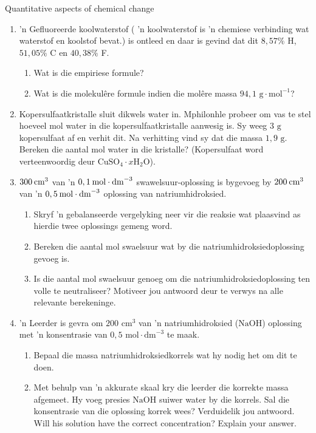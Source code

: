 \begin{eocexercises}{Quantitative aspects of chemical change}
\begin{enumerate}[noitemsep, label=\textbf{\arabic*}. ]
\item  'n Gefluoreerde koolwaterstof ( 'n koolwaterstof is 'n chemiese verbinding wat waterstof en koolstof bevat.) is ontleed en daar is gevind dat dit $8,57\%$ H, $51,05\%$ C en $40,38\%$ F.
 \begin{enumerate}[noitemsep, label=\textbf{\alph*}. ] 
 \item Wat is die empiriese formule?
 \item Wat is die molekulêre formule indien die mol\^{e}re massa $94,1\text{ g}\cdot {\text{mol}}^{-1}$?
 \end{enumerate}
\item Kopersulfaatkristalle sluit dikwels water in. Mphilonhle probeer om vas te stel hoeveel mol water in die kopersulfaatkristalle aanwesig is. Sy weeg $3 \text{ g}$ kopersulfaat af en verhit dit. Na verhitting vind sy dat die massa $1,9 \text{ g}$. Bereken die aantal mol water in die kristalle? (Kopersulfaat word verteenwoordig deur ${\text{CuSO}}_{4}\cdot x{\text{H}}_{2}\text{O}$).        
\item $300\phantom{\rule{2pt}{0ex}}{\text{cm}}^{3}$ van 'n $0,1\phantom{\rule{2pt}{0ex}}\text{mol}\ensuremath{\cdot}{\text{dm}}^{-3}$ swawelsuur-oplossing is bygevoeg by $200\phantom{\rule{2pt}{0ex}}{\text{cm}}^{3}$ van 'n $0,5\phantom{\rule{2pt}{0ex}}\text{mol}\ensuremath{\cdot}{\text{dm}}^{-3}$ oplossing van natriumhidroksied.
 \begin{enumerate}[noitemsep, label=\textbf{\alph*}. ] 
 \item Skryf 'n gebalanseerde vergelyking neer vir die reaksie wat plaasvind as hierdie twee oplossings gemeng word.
 \item Bereken die aantal mol swaelsuur wat by die natriumhidroksiedoplossing gevoeg is.
 \item Is die aantal mol swaelsuur genoeg om die natriumhidroksiedoplossing ten volle te neutraliseer? Motiveer jou antwoord deur te verwys na alle relevante berekeninge.
 \end{enumerate}
\item 'n Leerder is gevra om $200 {\text{ cm}}^{3}$ van  'n natriumhidroksied ($\text{NaOH}$) oplossing met  'n konsentrasie van $0,5 \text{ mol} \cdot {\text{dm}}^{-3}$ te maak.
 \begin{enumerate}[noitemsep, label=\textbf{\alph*}. ] 
 \item Bepaal die massa natriumhidroksiedkorrels wat hy nodig het om dit te doen.
 \item Met behulp van 'n akkurate skaal kry die leerder die korrekte massa afgemeet. Hy voeg presies $\text{NaOH}$ suiwer water by die korrels. Sal die konsentrasie van die oplossing korrek wees? Verduidelik jou antwoord. Will his solution have the correct concentration? Explain your answer.

\end{enumerate}
\end{enumerate}
\end{eocexercises}
